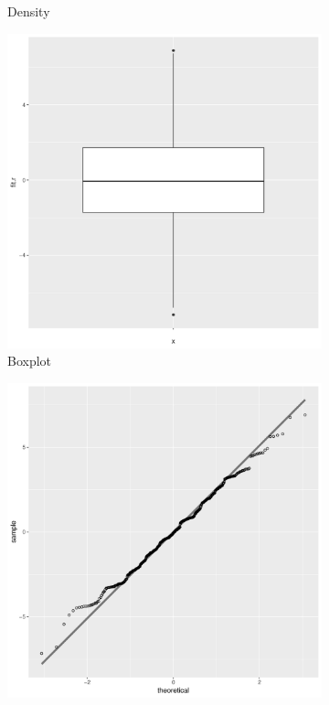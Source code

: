 \documentclass[11pt,openany]{book}\usepackage[]{graphicx}\usepackage[]{color}
\begin{document}
{\begin{figure}
\begin{subfigure}[b]{0.4\textwidth}
                \caption{Density \label{fig:multresidden2}}
        \end{subfigure}
        \begin{subfigure}[b]{0.4\textwidth}
                \centering
                \includegraphics[width=\textwidth]{15_Diagnostics/multresidbox.pdf} %
                \caption{Boxplot \label{fig:multresidbox}}
        \end{subfigure}
        \begin{subfigure}[b]{0.4\textwidth}
                \centering
                \includegraphics[width=\textwidth]{15_Diagnostics/multresidqq.pdf} %

\end{subfigure}
\end{figure}}
\end{document}
